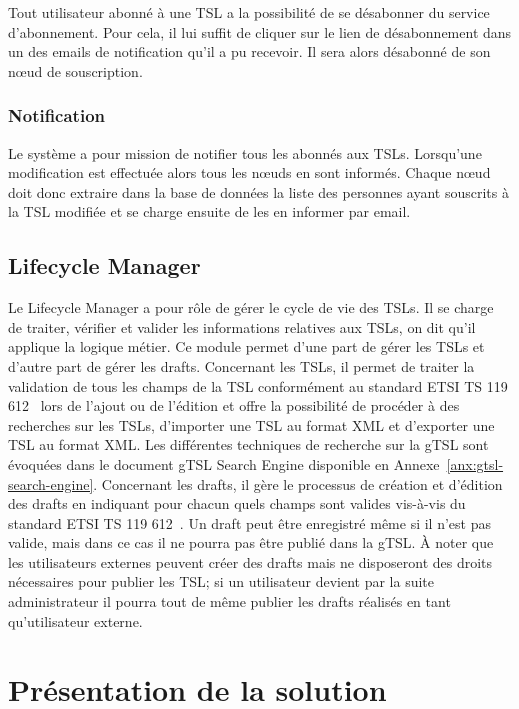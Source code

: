 \documentclass{tnreport}
\begin{document}
Tout utilisateur abonné à une TSL a la possibilité de se désabonner du service d'abonnement. Pour cela, il lui suffit de cliquer sur le lien de désabonnement dans un des emails de notification qu'il a pu recevoir. Il sera alors désabonné de son nœud de souscription.

\subsubsection{Notification}

Le système a pour mission de notifier tous les abonnés aux TSLs. Lorsqu'une modification est effectuée alors tous les nœuds en sont informés. Chaque nœud doit donc extraire dans la base de données la liste des personnes ayant souscrits à la TSL modifiée et se charge ensuite de les en informer par email.

\subsection{Lifecycle Manager}

Le Lifecycle Manager a pour rôle de gérer le cycle de vie des TSLs. Il se charge de traiter, vérifier et valider les informations relatives aux TSLs, on dit qu'il applique la logique métier. Ce module permet d'une part de gérer les TSLs et d'autre part de gérer les drafts. Concernant les TSLs, il permet de traiter la validation de tous les champs de la TSL conformément au standard ETSI TS 119 612~\cite{ETSITS119612} lors de l'ajout ou de l'édition et offre la possibilité de procéder à des recherches sur les TSLs, d'importer une TSL au format XML et d'exporter une TSL au format XML. Les différentes techniques de recherche sur la gTSL sont évoquées dans le document gTSL Search Engine disponible en Annexe~\ref{anx:gtsl-search-engine}. Concernant les drafts, il gère le processus de création et d'édition des drafts en indiquant pour chacun quels champs sont valides vis-à-vis du standard ETSI TS 119 612~\cite{ETSITS119612}. Un draft peut être enregistré même si il n'est pas valide, mais dans ce cas il ne pourra pas être publié dans la gTSL. À noter que les utilisateurs externes peuvent créer des drafts mais ne disposeront des droits nécessaires pour publier les TSL; si un utilisateur devient par la suite administrateur il pourra tout de même publier les drafts réalisés en tant qu'utilisateur externe.

\section{Présentation de la solution}
\end{document}
